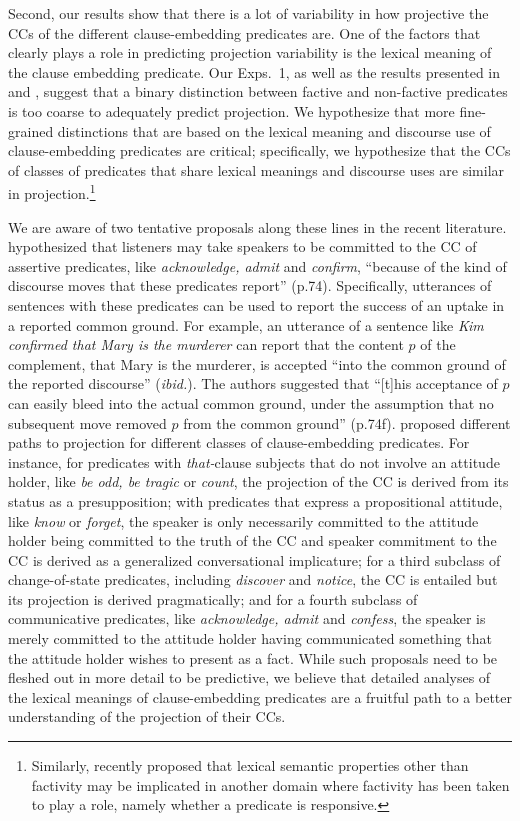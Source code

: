 \documentclass[11pt,fleqn]{article}
\newcommand{\6}{\mbox{$[\hspace*{-.6mm}[$}}
\newcommand{\9}{\mbox{$]\hspace*{-.6mm}]$}}
\begin{document}
Second, our results show that there is a lot of variability in how projective the CCs of the different clause-embedding predicates are. One of the factors that clearly plays a role in predicting projection variability is the lexical meaning of the clause embedding predicate. Our Exps.~1, as well as the results presented in \citealt{tbd-variability,demarneffe-etal-sub23} and \citealt{degen-tonhauser-openmind}, suggest that a binary distinction between factive and non-factive predicates is too coarse to adequately predict projection. We hypothesize that more fine-grained distinctions that are based on the lexical meaning and discourse use of clause-embedding predicates are critical; specifically, we hypothesize that the CCs of classes of predicates that share lexical meanings and discourse uses are similar in projection.\footnote{Similarly, \citealt{white2021} recently proposed that lexical semantic properties other than factivity may be implicated in another domain where factivity has been taken to play a role, namely whether a predicate is responsive.}
 

We are aware of two tentative proposals along these lines in the recent literature. \citet{anand-hacquard2014} hypothesized that listeners may take speakers to be committed to the CC of assertive predicates, like {\em acknowledge, admit} and {\em confirm},  ``because of the kind of discourse moves that these predicates report'' (p.74). Specifically, utterances of sentences with these predicates can be used to report the success of an uptake in a reported common ground. For example, an utterance of a sentence like {\em Kim confirmed that Mary is the murderer} can report that the content $p$ of the  complement, that Mary is the murderer, is accepted ``into the common ground of the reported discourse'' ({\em ibid.}). The authors suggested that ``[t]his acceptance of $p$ can easily bleed into the actual common ground, under the assumption that no subsequent move removed $p$ from the common ground'' (p.74f). \citet{karttunen2016}  proposed different paths to projection for different classes of clause-embedding predicates. For instance, for predicates with {\em that-}clause subjects that do not involve an attitude holder, like {\em be odd, be tragic} or {\em count}, the projection of the CC is derived from its status as a presupposition; with predicates that express a propositional attitude, like {\em know} or {\em forget}, the speaker is only necessarily committed to the attitude holder being committed to the truth of the CC and speaker commitment to the CC is derived as a generalized conversational implicature; for a third subclass of change-of-state predicates, including {\em discover} and {\em notice}, the CC is entailed but its projection is derived pragmatically; and for a fourth subclass of communicative predicates, like {\em acknowledge, admit} and {\em confess}, the speaker is merely committed to the attitude holder having communicated something that the attitude holder wishes to present as a fact. While such proposals need to be fleshed out in more detail to be predictive, we believe that detailed analyses of the lexical meanings of clause-embedding predicates are a fruitful path to a better understanding of the projection of their CCs.
\end{document}
